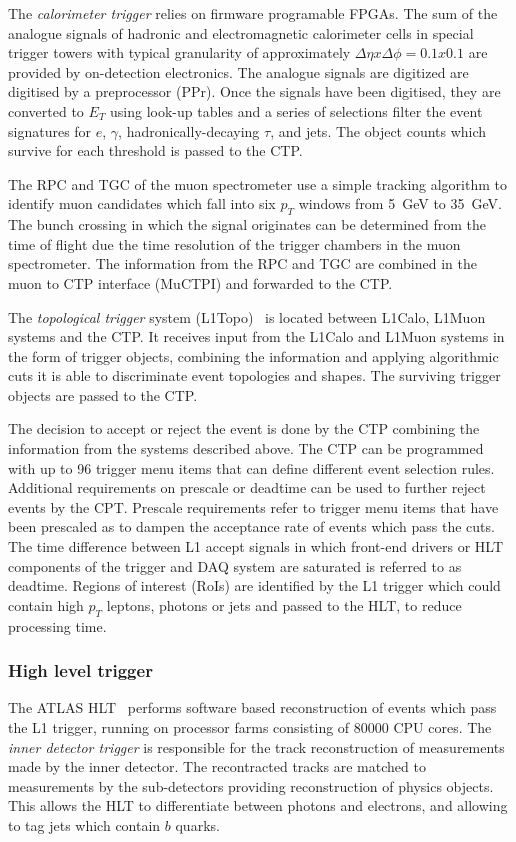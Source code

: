 The \emph{calorimeter trigger} relies on firmware programable FPGAs. The sum of the analogue signals of hadronic and electromagnetic calorimeter cells in special trigger towers with typical granularity of approximately $\Delta\eta x \Delta\phi = 0.1 x 0.1$ are provided by on-detection electronics. The analogue signals are digitized are digitised by a preprocessor (PPr). Once the signals have been digitised, they are converted to $E_{T}$ using look-up tables and a series of selections filter the event signatures for $e$, $\gamma$, hadronically-decaying $\tau$, and jets. The object counts which survive for each threshold is passed to the CTP. 

The RPC and TGC of the muon spectrometer use a simple tracking algorithm to identify muon candidates which fall into six $p_{T}$ windows from \SI{5}{\giga\electronvolt} to \SI{35}{\giga\electronvolt}. The bunch crossing in which the signal originates can be determined from the time of flight due the time resolution of the trigger chambers in the muon spectrometer. The information from the RPC and TGC are combined in the muon to CTP interface (MuCTPI) and forwarded to the CTP. 

The \emph{topological trigger} system (L1Topo)~\cite{ATLAS:L1Topo} is located between L1Calo, L1Muon systems and the CTP. It receives input from the L1Calo and L1Muon systems in the form of trigger objects, combining the information and applying algorithmic cuts it is able to discriminate event topologies and shapes. The surviving trigger objects are passed to the CTP.

The decision to accept or reject the event is done by the CTP combining the information from the systems described above. The CTP can be programmed with up to 96 trigger menu items that can define different event selection rules. Additional requirements on prescale or deadtime can be used to further reject events by the CPT. Prescale requirements refer to trigger menu items that have been prescaled as to dampen the acceptance rate of events which pass the cuts. The time difference between L1 accept signals in which front-end drivers or HLT components of the trigger and DAQ system are saturated is referred to as deadtime. Regions of interest (RoIs) are identified by the L1 trigger which could contain high $p_T$ leptons, photons or jets and passed to the HLT, to reduce processing time. 

\subsubsection{High level trigger}
The ATLAS HLT~\cite{ATLAS:HLT-TDR,ATLAS:TDAQ-Run2} performs software based reconstruction of events which pass the L1 trigger, running on processor farms consisting of 80000 CPU cores. The \emph{inner detector trigger} is responsible for the track reconstruction of measurements made by the inner detector. The recontracted tracks are matched to measurements by the sub-detectors providing reconstruction of physics objects. This allows the HLT to differentiate between photons and electrons, and allowing to tag jets which contain $b$ quarks. 

